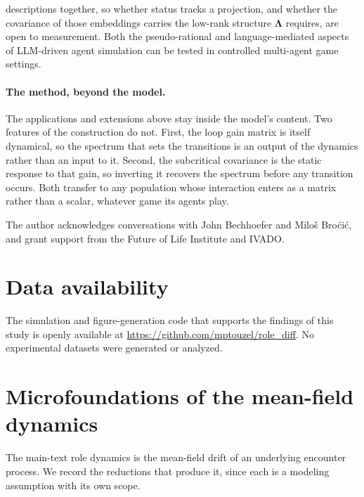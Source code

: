 \documentclass[
  aps,prx,
  reprint,
  superscriptaddress,
  nofootinbib,
  longbibliography
]{revtex4-2}
\newcommand{\Lam}{\bm{\Lambda}}
\begin{document}
descriptions together, so whether status tracks a projection, and whether the covariance of those embeddings carries the low-rank structure $\Lam$ requires, are open to measurement. Both the pseudo-rational and language-mediated aspects of LLM-driven agent simulation can be tested in controlled multi-agent game settings.

\paragraph{The method, beyond the model.} The applications and extensions above stay inside the model's content. Two features of the construction do not. First, the loop gain matrix is itself dynamical, so the spectrum that sets the transitions is an output of the dynamics rather than an input to it. Second, the subcritical covariance is the static response to that gain, so inverting it recovers the spectrum before any transition occurs. Both transfer to any population whose interaction enters as a matrix rather than a scalar, whatever game its agents play.

\begin{acknowledgments}
The author acknowledges conversations with John Bechhoefer and Milo\v{s} Bro\'{c}i\'{c},
and grant support from the Future of Life Institute and IVADO.
\end{acknowledgments}

\section*{Data availability}
\noindent The simulation and figure-generation code that supports the findings of this study is
openly available at \url{https://github.com/mptouzel/role_diff}. No
experimental datasets were generated or analyzed.

\appendix

\section{Microfoundations of the mean-field dynamics}\label{app:micro}

\noindent The main-text role dynamics is the mean-field drift of an underlying encounter process. We record the reductions that produce it, since each is a modeling assumption with its own scope.
\end{document}
